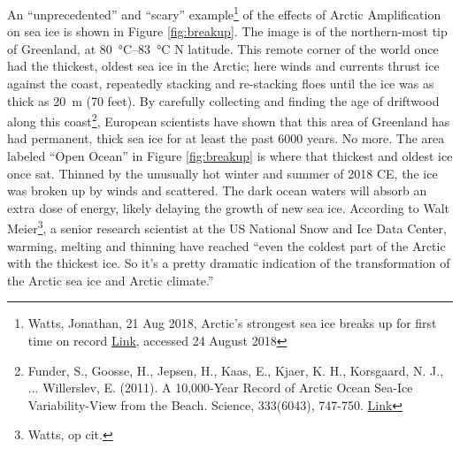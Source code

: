 An ``unprecedented'' and ``scary'' example\footnote{Watts, Jonathan, 21 Aug 2018, Arctic's strongest sea ice breaks up for first time on record \href{https://www.theguardian.com/world/2018/aug/21/arctics-strongest-sea-ice-breaks-up-for-first-time-on-record}{Link}, accessed 24 August 2018} of the effects of Arctic Amplification on sea ice is shown in Figure \ref{fig:breakup}. The image is of the northern-most tip of Greenland, at \SIrange{80}{83}{\celsius} N latitude. This remote corner of the world once had the thickest, oldest sea ice in the Arctic; here winds and currents thrust ice against the coast, repeatedly stacking and re-stacking floes until the ice was as thick as \SI{20}{\metre} (70 feet). By carefully collecting and finding the age of driftwood along this coast\footnote{Funder, S., Goosse, H., Jepsen, H., Kaas, E., Kjaer, K. H., Korsgaard, N. J., ... Willerslev, E. (2011). A 10,000-Year Record of Arctic Ocean Sea-Ice Variability-View from the Beach. Science, 333(6043), 747-750. \href{https://doi.org/10.1126/science.1202760}{Link}}, European scientists have shown that this area of Greenland has had permanent, thick sea ice for at least the past 6000 years. No more. The area labeled ``Open Ocean'' in Figure \ref{fig:breakup} is where that thickest and oldest ice once sat. Thinned by the unusually hot winter and summer of 2018 CE, the ice was broken up by winds and scattered. The dark ocean waters will absorb an extra dose of energy, likely delaying the growth of new sea ice. According to Walt Meier\footnote{Watts, op cit.}, a senior research scientist at the US National Snow and Ice Data Center, warming, melting and thinning have reached ``even the coldest part of the Arctic with the thickest ice. So it's a pretty dramatic indication of the transformation of the Arctic sea ice and Arctic climate.''\\  

